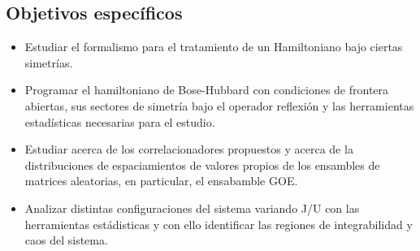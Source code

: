 \documentclass[spanish,titlepage,table]{practicas}
\begin{document}
 \subsection{Objetivos específicos}
 \begin{itemize}
    \item Estudiar el formalismo para el tratamiento de un Hamiltoniano bajo ciertas simetrías.
    \item Programar el hamiltoniano de Bose-Hubbard con condiciones de frontera abiertas, sus sectores de simetría bajo el operador reflexión y las herramientas estadísticas necesarias para el estudio.
    \item Estudiar acerca de los correlacionadores propuestos y acerca de la distribuciones de espaciamientos de valores propios de los ensambles de matrices aleatorias, en particular, el ensabamble GOE.
    \item Analizar distintas configuraciones del sistema variando J/U\janote{\$\$} con las herramientas estádisticas y con ello identificar las regiones de integrabilidad y caos del sistema.
 \end{itemize}
\end{document}

